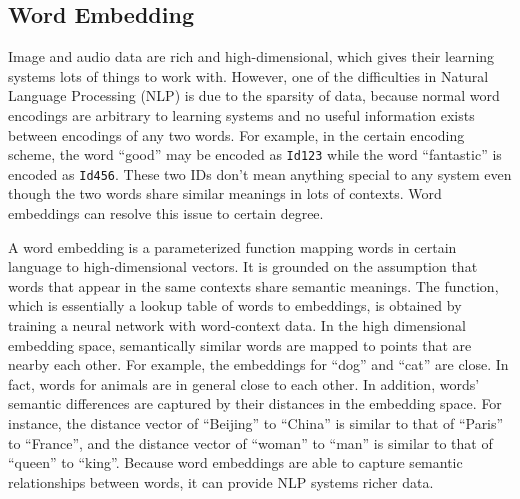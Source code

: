 \subsection{Word Embedding}

Image and audio data are rich and high-dimensional, which gives their learning systems lots of things to work with. However, one of the difficulties in Natural Language Processing (NLP) is due to the sparsity of data, because normal word encodings are arbitrary to learning systems and no useful information exists between encodings of any two words. For example, in the certain encoding scheme, the word ``good'' may be encoded as {\tt Id123} while the word ``fantastic'' is encoded as {\tt Id456}. These two IDs don't mean anything special to any system even though the two words share similar meanings in lots of contexts. Word embeddings can resolve this issue to certain degree.

A word embedding is a parameterized function mapping words in certain language to high-dimensional vectors. It is grounded on the assumption that words that appear in the same contexts share semantic meanings. The function, which is essentially a lookup table of words to embeddings, is obtained by training a neural network with word-context data. In the high dimensional embedding space, semantically similar words are mapped to points that are nearby each other. For example, the embeddings for ``dog'' and ``cat'' are close. In fact, words for animals are in general close to each other. In addition, words' semantic differences are captured by their distances in the embedding space. For instance, the distance vector of ``Beijing'' to ``China'' is similar to that of ``Paris'' to ``France'', and the distance vector of ``woman'' to ``man'' is similar to that of ``queen'' to ``king''. Because word embeddings are able to capture semantic relationships between words, it can provide NLP systems richer data. 

